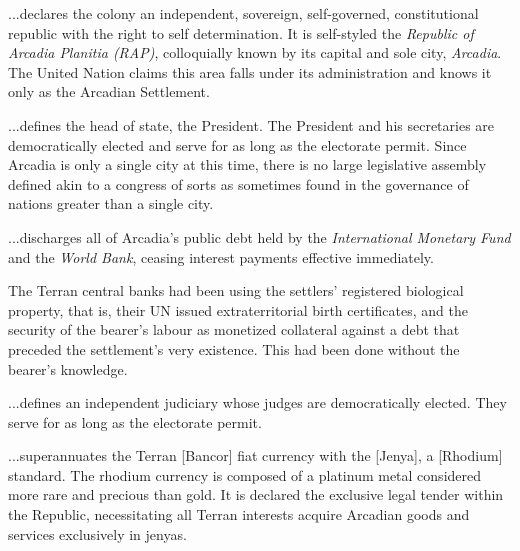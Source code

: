 
\startitemize[R]
\setupitemize[left=Article\space, right=, stopper=]
\item %

...declares the colony an independent, sovereign, self-governed, constitutional republic with the right to self determination. It is self-styled the {\it Republic of Arcadia Planitia (RAP)}, colloquially known by its capital and sole city, {\it Arcadia}. The United Nation claims this area falls under its administration and knows it only as the Arcadian Settlement.

\item %

...defines the head of state, the President. The President and his secretaries are democratically elected and serve for as long as the electorate permit. Since Arcadia is only a single city at this time, there is no large legislative assembly defined akin to a congress of sorts as sometimes found in the governance of nations greater than a single city.

\item %

...discharges all of Arcadia's public debt held by the {\it International Monetary Fund} and the {\it World Bank}, ceasing interest payments effective immediately. 

The Terran central banks had been using the settlers' registered biological property, that is, their UN issued extraterritorial birth certificates, and the security of the bearer's labour as monetized collateral against a debt that preceded the settlement's very existence. This had been done without the bearer's knowledge.

\item %

...defines an independent judiciary whose judges are democratically elected. They serve for as long as the electorate permit.
\stopitemize

\startitemize[R][start=7]
\setupitemize[left=Article\space, right=, stopper=]
\item %

...superannuates the Terran [Bancor] fiat currency with the [Jenya], a [Rhodium] standard. The rhodium currency is composed of a platinum metal considered more rare and precious than gold. It is declared the exclusive legal tender within the Republic, necessitating all Terran interests acquire Arcadian goods and services exclusively in jenyas.

